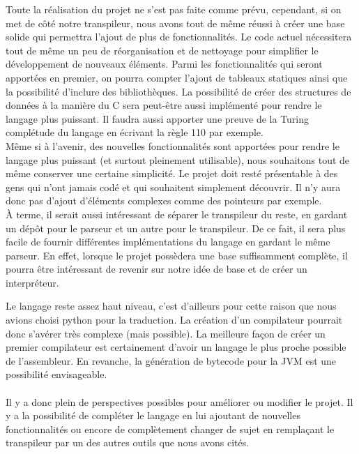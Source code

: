 \documentclass[a4paper]{article}%
\begin{document}
Toute la réalisation du projet ne s'est pas faite comme prévu, cependant, si on
met de côté notre transpileur, nous avons tout de même réussi à créer une base
solide qui permettra l'ajout de plus de fonctionnalités. Le code actuel
nécessitera tout de même un peu de réorganisation et de nettoyage pour
simplifier le développement de nouveaux éléments. Parmi les fonctionnalités qui
seront apportées en premier, on pourra compter l'ajout de tableaux statiques
ainsi que la possibilité d'inclure des bibliothèques. La possibilité de créer
des structures de données à la manière du C sera peut-être aussi implémenté pour
rendre le langage plus puissant. Il faudra aussi apporter une preuve de la
Turing complétude du langage en écrivant la règle 110 par exemple.\\

Même si à l'avenir, des nouvelles fonctionnalités sont apportées pour rendre le
langage plus puissant (et surtout pleinement utilisable), nous souhaitons tout
de même conserver une certaine simplicité. Le projet doit resté présentable à
des gens qui n'ont jamais codé et qui souhaitent simplement découvrir. Il n'y
aura donc pas d'ajout d'éléments complexes comme des pointeurs par exemple.\\

À terme, il serait aussi intéressant de séparer le transpileur du reste, en
gardant un dépôt pour le parseur et un autre pour le transpileur. De ce fait, il
sera plus facile de fournir différentes implémentations du langage en gardant
le même parseur. En effet, lorsque le projet possèdera une base suffisamment
complète, il pourra être intéressant de revenir sur notre idée de base et de
créer un interpréteur.

Le langage reste assez haut niveau, c'est d'ailleurs pour cette raison que nous
avions choisi python pour la traduction. La création d'un compilateur pourrait
donc s'avérer très complexe (mais possible). La meilleure façon de créer un
premier compilateur est certainement d'avoir un langage le plus proche possible
de l'assembleur. En revanche, la génération de bytecode pour la JVM est une
possibilité envisageable.\\~\\

Il y a donc plein de perspectives possibles pour améliorer ou modifier le
projet. Il y a la possibilité de compléter le langage en lui ajoutant de
nouvelles fonctionnalités ou encore de complètement changer de sujet en
remplaçant le transpileur par un des autres outils que nous avons cités.
\end{document}
